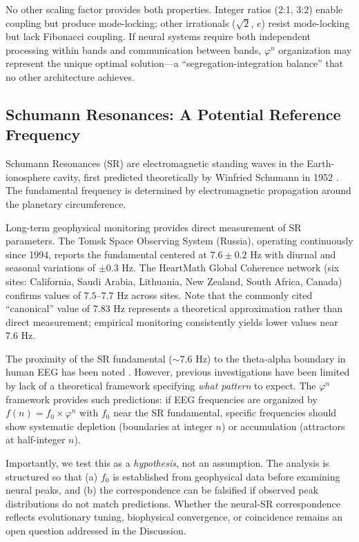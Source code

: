 \documentclass[11pt,a4paper]{article}
\newcommand{\phisym}{\varphi}
\newcommand{\fzero}{f_0}
\begin{document}
No other scaling factor provides both properties. Integer ratios (2:1, 3:2) enable coupling but produce mode-locking; other irrationals ($\sqrt{2}$, $e$) resist mode-locking but lack Fibonacci coupling. If neural systems require both independent processing within bands and communication between bands, $\phisym^n$ organization may represent the unique optimal solution---a ``segregation-integration balance'' that no other architecture achieves.

\subsection{Schumann Resonances: A Potential Reference Frequency}

Schumann Resonances (SR) are electromagnetic standing waves in the Earth-ionosphere cavity, first predicted theoretically by Winfried Schumann in 1952 \citep{schumann1952}. The fundamental frequency is determined by electromagnetic propagation around the planetary circumference.

Long-term geophysical monitoring provides direct measurement of SR parameters. The Tomsk Space Observing System (Russia), operating continuously since 1994, reports the fundamental centered at $7.6 \pm 0.2$ Hz with diurnal and seasonal variations of $\pm 0.3$ Hz. The HeartMath Global Coherence network (six sites: California, Saudi Arabia, Lithuania, New Zealand, South Africa, Canada) confirms values of $7.5$--$7.7$ Hz across sites. Note that the commonly cited ``canonical'' value of 7.83 Hz represents a theoretical approximation rather than direct measurement; empirical monitoring consistently yields lower values near 7.6 Hz.

The proximity of the SR fundamental ($\sim$7.6 Hz) to the theta-alpha boundary in human EEG has been noted \citep{persinger2014, saroka2016}. However, previous investigations have been limited by lack of a theoretical framework specifying \textit{what pattern} to expect. The $\phisym^n$ framework provides such predictions: if EEG frequencies are organized by $f(n) = \fzero \times \phisym^n$ with $\fzero$ near the SR fundamental, specific frequencies should show systematic depletion (boundaries at integer $n$) or accumulation (attractors at half-integer $n$).

Importantly, we test this as a \textit{hypothesis}, not an assumption. The analysis is structured so that (a) $\fzero$ is established from geophysical data before examining neural peaks, and (b) the correspondence can be falsified if observed peak distributions do not match predictions. Whether the neural-SR correspondence reflects evolutionary tuning, biophysical convergence, or coincidence remains an open question addressed in the Discussion.
\end{document}
